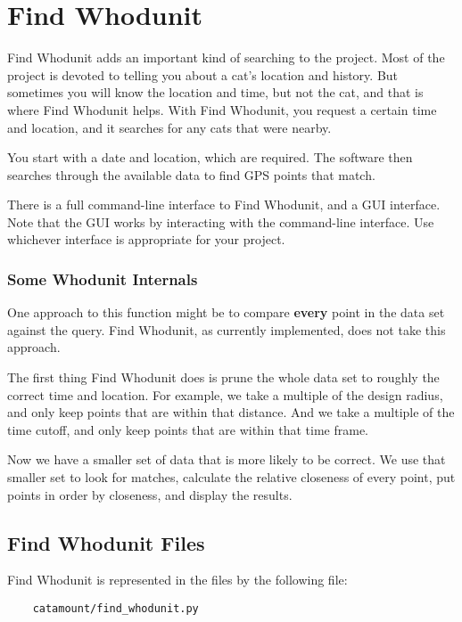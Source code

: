 \chapter{Find Whodunit}
\hypertarget{find-whodunit}{}

Find Whodunit adds an important kind of searching to the project. Most
of the project is devoted to telling you about a cat's location and
history. But sometimes you will know the location and time, but not
the cat, and that is where Find Whodunit helps. With Find Whodunit,
you request a certain time and location, and it searches for any cats
that were nearby.

You start with a date and location, which are required. The software
then searches through the available data to find GPS points that
match.

There is a full command-line interface to Find Whodunit, and a GUI
interface. Note that the GUI works by interacting with the command-line
interface. Use whichever interface is appropriate for your project.

\subsection{Some Whodunit Internals}

One approach to this function might be to compare \textbf{every} point
in the data set against the query. Find Whodunit, as currently
implemented, does not take this approach.

The first thing Find Whodunit does is prune the whole data set to
roughly the correct time and location. For example, we take a multiple
of the design radius, and only keep points that are within that
distance. And we take a multiple of the time cutoff, and only keep
points that are within that time frame.

Now we have a smaller set of data that is more likely to be correct.
We use that smaller set to look for matches, calculate the relative
closeness of every point, put points in order by closeness, and
display the results.

\section{Find Whodunit Files}

Find Whodunit is represented in the files by the following file:

\begin{verbatim}
    catamount/find_whodunit.py
\end{verbatim}

